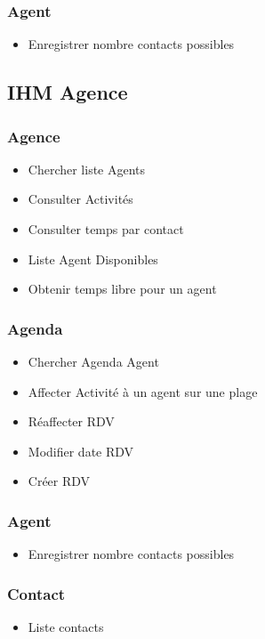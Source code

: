     \subsubsection{Agent}

        \begin{itemize}
            \item Enregistrer nombre contacts possibles 
        \end{itemize}

\subsection{IHM Agence}

    \subsubsection{Agence}
    
        \begin{itemize}
            \item Chercher liste Agents
            \item Consulter Activités
            \item Consulter temps par contact
			\item Liste Agent Disponibles
			\item Obtenir temps libre pour un agent
        \end{itemize}

    \subsubsection{Agenda}

        \begin{itemize}
            \item Chercher Agenda Agent
            \item Affecter Activité à un agent sur une plage
            \item Réaffecter RDV
			\item Modifier date RDV
            \item Créer RDV
        \end{itemize}

    \subsubsection{Agent}

        \begin{itemize}
            \item Enregistrer nombre contacts possibles 
        \end{itemize}
		
	\subsubsection{Contact}
		\begin{itemize}
			\item Liste contacts
		\end{itemize}
		
